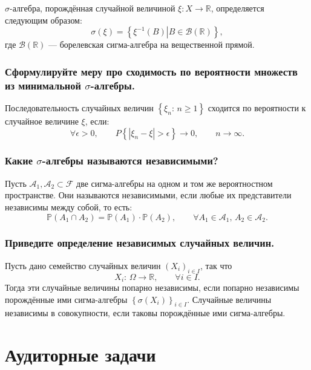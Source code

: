 $ \sigma $-алгебра, порождённая случайной величиной $ \xi: X \rightarrow \mathbb{R} $, определяется следующим образом:
$$ \sigma \left( \xi \right) =
\left\{ \left. \xi^{-1} \left( B \right) \right| B \in \mathcal{B} \left( \mathbb{R} \right) \right\},$$
где $ \mathcal{B} \left( \mathbb{R} \right) $ --- борелевская сигма-алгебра на вещественной прямой.

\subsubsection*{Сформулируйте меру про сходимость по вероятности множеств из минимальной $ \sigma $-алгебры.}

Последовательность случайных величин $ \left\{ \xi_n: \, n \geq 1 \right\} $ сходится по вероятности к случайное величине $ \xi $, если:
$$ \forall \epsilon > 0, \qquad
P \left\{ \left| \xi_n - \xi \right| > \epsilon \right\} \rightarrow 0, \qquad
n \rightarrow \infty.$$

\subsubsection*{Какие $ \sigma $-алгебры называются независимыми?}

Пусть $ \mathcal{A}_1, \mathcal{A}_2 \subset \mathcal{F} $ две сигма-алгебры на одном и том же вероятностном пространстве.
Они называются независимыми, если любые их представители независимы между собой, то есть:
$$ \mathbb{P} \left( A_1 \cap A_2 \right) =
\mathbb{P} \left( A_1 \right) \cdot \mathbb{P} \left( A_2 \right), \qquad
\forall A_1 \in \mathcal{A}_1, \,
A_2 \in \mathcal{A}_2.$$

\subsubsection*{Приведите определение независимых случайных величин.}

Пусть дано семейство случайных величин $ \left( X_i \right)_{i \in I} $,
так что
$$X_i: \,
\Omega \rightarrow \mathbb{R}, \qquad
\forall i \in I.$$
Тогда эти случайные величины попарно независимы,
если попарно независимы порождённые ими сигма-алгебры $ \left\{ \sigma \left( X_i \right) \right\}_{i \in I} $.
Случайные величины независимы в совокупности, если таковы порождённые ими сигма-алгебры.

\section*{Аудиторные задачи}

